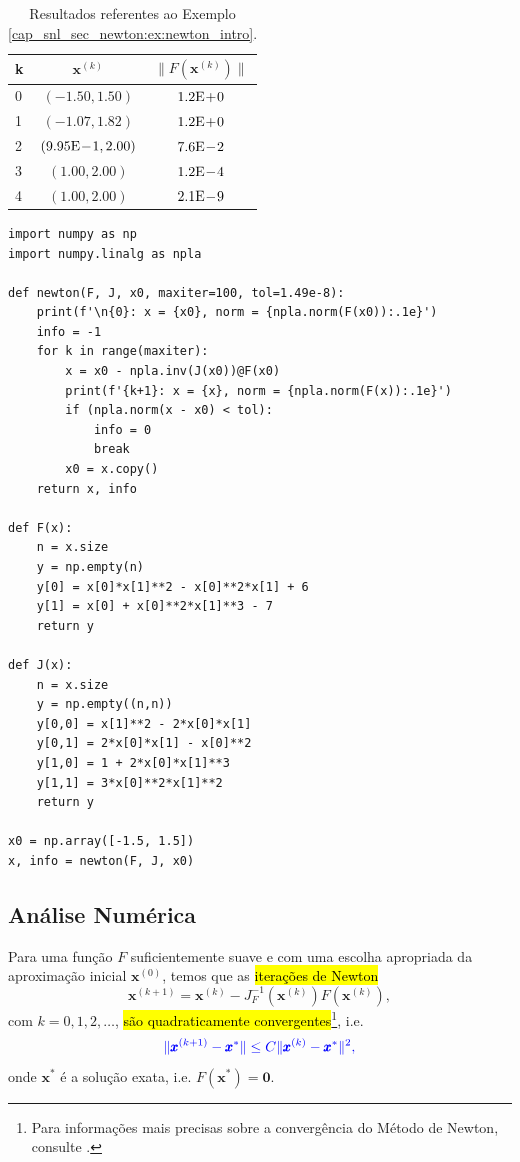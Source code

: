 \begin{ex}
  \begin{table}[H]
    \centering
    \caption{Resultados referentes ao Exemplo \ref{cap_snl_sec_newton:ex:newton_intro}.}
    \begin{tabular}{lcc}
      k & $\pmb{x}^{(k)}$ & $\|F(\pmb{x}^{(k)})\|$\\\hline
      0 & $(-1.50, 1.50)$ & $1.2\mathrm{E}\!+\!0$\\
      1 & $(-1.07, 1.82)$ & $1.2\mathrm{E}\!+\!0$\\
      2 & $(9.95\mathrm{E}\!-\!1, 2.00)$ & $7.6\mathrm{E}\!-\!2$\\
      3 & $(1.00, 2.00)$ & $1.2\mathrm{E}\!-\!4$ \\
      4 & $(1.00, 2.00)$ & $2.1\mathrm{E}\!-\!9$ \\\hline
    \end{tabular}
    \label{cap_snl_sec_newton:tab:newton_intro}
  \end{table}

\begin{lstlisting}
import numpy as np
import numpy.linalg as npla

def newton(F, J, x0, maxiter=100, tol=1.49e-8):
    print(f'\n{0}: x = {x0}, norm = {npla.norm(F(x0)):.1e}')
    info = -1
    for k in range(maxiter):
        x = x0 - npla.inv(J(x0))@F(x0)
        print(f'{k+1}: x = {x}, norm = {npla.norm(F(x)):.1e}')
        if (npla.norm(x - x0) < tol):
            info = 0
            break
        x0 = x.copy()
    return x, info

def F(x):
    n = x.size
    y = np.empty(n)
    y[0] = x[0]*x[1]**2 - x[0]**2*x[1] + 6
    y[1] = x[0] + x[0]**2*x[1]**3 - 7
    return y

def J(x):
    n = x.size
    y = np.empty((n,n))
    y[0,0] = x[1]**2 - 2*x[0]*x[1]
    y[0,1] = 2*x[0]*x[1] - x[0]**2
    y[1,0] = 1 + 2*x[0]*x[1]**3
    y[1,1] = 3*x[0]**2*x[1]**2
    return y

x0 = np.array([-1.5, 1.5])
x, info = newton(F, J, x0)
\end{lstlisting}
\end{ex}

\subsection{Análise Numérica}

Para uma função $F$ suficientemente suave e com uma escolha apropriada da aproximação inicial $\pmb{x}^{(0)}$, temos que as \hl{iterações de Newton}
\begin{equation}
  \pmb{x}^{(k+1)} = \pmb{x}^{(k)} - J_F^{-1}(\pmb{x}^{(k)})F(\pmb{x}^{(k)}),
\end{equation}
com $k=0, 1, 2, \ldots$, \hl{são quadraticamente convergentes}\footnote{Para informações mais precisas sobre a convergência do Método de Newton, consulte \cite[Seção 5.3]{Stoer1993a}.}, i.e.
\begin{equation}\color{blue}\|\pmb{x}^{(k+1)} - \pmb{x}^*\| \leq C\|\pmb{x}^{(k)}-\pmb{x}^*\|^2,
\end{equation}
onde $\pmb{x}^*$ é a solução exata, i.e. $F(\pmb{x}^*) = \pmb{0}$.

